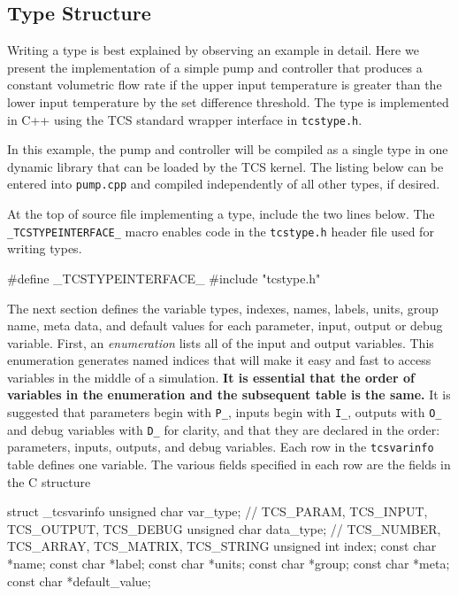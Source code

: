 \documentclass{article}
\begin{document}
\subsection{Type Structure}

Writing a type is best explained by observing an example in detail.  Here we present the implementation of a simple pump and controller that produces a constant volumetric flow rate if the upper input temperature is greater than the lower input temperature by the set difference threshold.  The type is implemented in C++ using the TCS standard wrapper interface in \texttt{tcstype.h}.


In this example, the pump and controller will be compiled as a single type in one dynamic library that can be loaded by the TCS kernel.  The listing below can be entered into \texttt{pump.cpp} and compiled independently of all other types, if desired.


At the top of source file implementing a type, include the two lines below.  The \texttt{\_TCSTYPEINTERFACE\_} macro enables code in the \texttt{tcstype.h} header file used for writing types.

\begin{verbatimtab}[4]
#define _TCSTYPEINTERFACE_
#include "tcstype.h"

\end{verbatimtab}

The next section defines the variable types, indexes, names, labels, units, group name, meta data, and default values for each parameter, input, output or debug variable.  First, an \emph{enumeration} lists all of the input and output variables.  This enumeration generates named indices that will make it easy and fast to access variables in the middle of a simulation. \textbf{It is essential that the order of variables in the enumeration and the subsequent table is the same.}  It is suggested that parameters begin with \texttt{P\_}, inputs begin with \texttt{I\_}, outputs with \texttt{O\_} and debug variables with \texttt{D\_} for clarity, and that they are declared in the order: parameters, inputs, outputs, and debug variables.  Each row in the \texttt{tcsvarinfo} table defines one variable.  The various fields specified in each row are the fields in the C structure
\begin{center}
\begin{boxedverbatim}
struct _tcsvarinfo {
  unsigned char var_type; // TCS_PARAM, TCS_INPUT, TCS_OUTPUT, TCS_DEBUG
  unsigned char data_type; // TCS_NUMBER, TCS_ARRAY, TCS_MATRIX, TCS_STRING
  unsigned int index;
  const char *name;
  const char *label;
  const char *units;
  const char *group;
  const char *meta;
  const char *default_value;
}
\end{boxedverbatim}
\end{center}
\end{document}
